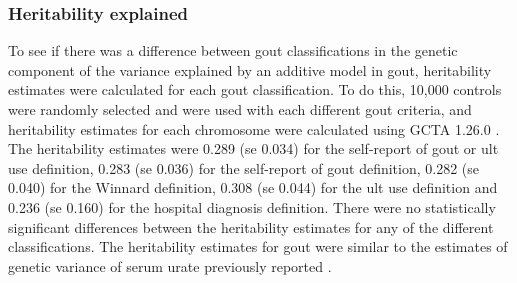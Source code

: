 \documentclass[twoside,openright]{report}
\begin{document}
\subsubsection{Heritability explained}\label{heritability-explained}

To see if there was a difference between gout classifications in the
genetic component of the variance explained by an additive model in
gout, heritability estimates were calculated for each gout
classification. To do this, 10,000 controls were randomly selected and
were used with each different gout criteria, and heritability estimates
for each chromosome were calculated using GCTA 1.26.0
\citep{Yang2011part}. The heritability estimates were 0.289
(\acrshort{se} 0.034) for the self-report of gout or \gls{ult} use
definition, 0.283 (\acrshort{se} 0.036) for the self-report of gout
definition, 0.282 (\acrshort{se} 0.040) for the Winnard definition,
0.308 (\acrshort{se} 0.044) for the \gls{ult} use definition and 0.236
(\acrshort{se} 0.160) for the hospital diagnosis definition. There were
no statistically significant differences between the heritability
estimates for any of the different classifications. The heritability
estimates for gout were similar to the estimates of genetic variance of
serum urate previously reported \citep{Kottgen2013}.
\end{document}
